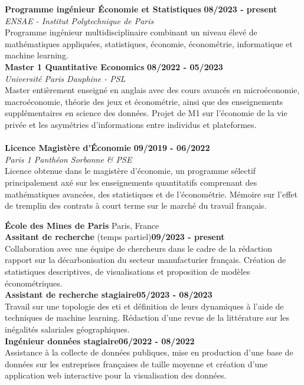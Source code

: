 \documentclass[11pt]{report}
\begin{document}
	
\noindent\textbf{Programme ingénieur \textbar\space Économie et Statistiques}
\hfill
\textbf{08/2023 - present} \\
\emph{ENSAE - Institut Polytechnique de Paris}\\
Programme ingénieur multidisciplinaire combinant un niveau élevé de mathématiques appliquées, statistiques,  économie, économétrie, informatique et machine learning. \\

\noindent\textbf{Master 1 \textbar\space Quantitative Economics}
\hfill
\textbf{08/2022 - 05/2023} \\
\emph{Université Paris Dauphine - PSL}\\
Master entièrement enseigné en anglais avec des cours avancés en microéconomie, macroéconomie, théorie des jeux et économétrie, ainsi que des enseignements supplémentaires en science des données. Projet de M1 sur l'économie de la vie privée et les asymétries d'informations entre individus et plateformes.\\
\\
\noindent\textbf{Licence \textbar\space Magistère d'Économie}
\hfill
\textbf{09/2019 - 06/2022} \\
\emph{Paris 1 Panthéon Sorbonne \& PSE}\\
Licence obtenue dans le magistère d'économie, un programme sélectif principalement axé sur les enseignements quantitatifs comprenant des mathématiques avancées, des statistiques et de l'économétrie. Mémoire sur l'effet de tremplin des contrats à court terme sur le marché du travail français.

	\begin{flushleft}
	 \hrulefill
	\end{flushleft}


\noindent\textbf{École des Mines de Paris} \hfill Paris, France\\[0.1cm]
\textbf{Assitant de recherche} (temps partiel)\hfill \textbf{09/2023 - present} \\
Collaboration avec une équipe de chercheurs dans le cadre de la rédaction rapport sur la décarbonisation du secteur manufacturier français. Création de statistiques descriptives, de visualisations et proposition de modèles économétriques. \\[0.15cm]
\textbf{Assistant de recherche stagiaire}\hfill \textbf{05/2023 - 08/2023} \\
Travail sur une topologie des eti et définition de leurs dynamiques à l'aide de techniques de machine learning. Rédaction d'une revue de la littérature sur les inégalités salariales géographiques. \\[0.15cm]
\textbf{Ingénieur données stagiaire}\hfill \textbf{06/2022 - 08/2022} \\
Assistance à la collecte de données publiques, mise en production d'une base de données sur les entreprises françaises de taille moyenne et création d'une application web interactive pour la visualisation des données.\\
\end{document}
